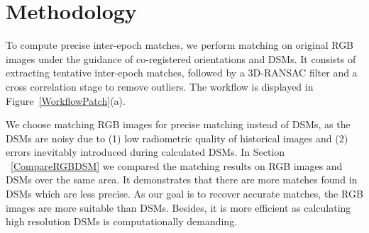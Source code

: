 \section{Methodology}
To compute precise {inter-epoch} matches, we perform matching on original RGB images {under the guidance of co-registered orientations and \ac{DSM}s}. {It consists of extracting tentative inter-epoch matches, followed by a 3D-RANSAC filter and a cross correlation stage to remove outliers.} The workflow is displayed in Figure~\ref{WorkflowPatch}(a).
\par
We choose matching RGB images for precise matching instead of \ac{DSM}s, as the \ac{DSM}s are noisy due to (1) low radiometric quality of historical images and (2) errors inevitably introduced during calculated \ac{DSM}s. In Section ~\ref{CompareRGBDSM} %
we compared the matching results on RGB images and \ac{DSM}s over the same area. It demonstrates that there are more matches found in \ac{DSM}s which are less precise. As our goal is to recover accurate matches, the RGB images are more suitable than \ac{DSM}s. Besides, it is more efficient as calculating high resolution \ac{DSM}s is computationally demanding.\\

